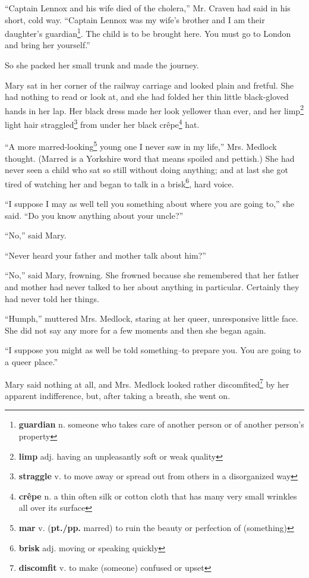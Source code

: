 ``Captain Lennox and his wife died of the cholera,'' Mr. Craven had said in his short, cold way. ``Captain Lennox was my wife's brother and I am their daughter's guardian\footnote{\textbf{guardian} n. someone who takes care of another person or of another person's property}. The child is to be brought here. You must go to London and bring her yourself.''

So she packed her small trunk and made the journey.

Mary sat in her corner of the railway carriage and looked plain and fretful. She had nothing to read or look at, and she had folded her thin little black-gloved hands in her lap. Her black dress made her look yellower than ever, and her limp\footnote{\textbf{limp} adj. having an unpleasantly soft or weak quality} light hair straggled\footnote{\textbf{straggle} v. to move away or spread out from others in a disorganized way} from under her black cr\^{e}pe\footnote{\textbf{cr\^{e}pe} n. a thin often silk or cotton cloth that has many very small wrinkles all over its surface} hat.

``A more marred-looking\footnote{\textbf{mar} v. (\textbf{pt./pp.} marred) to ruin the beauty or perfection of (something)} young one I never saw in my life,'' Mrs. Medlock thought. (Marred is a Yorkshire word that means spoiled and pettish.) She had never seen a child who sat so still without doing anything; and at last she got tired of watching her and began to talk in a brisk\footnote{\textbf{brisk} adj. moving or speaking quickly }, hard voice.

``I suppose I may as well tell you something about where you are going to,'' she said. ``Do you know anything about your uncle?''

``No,'' said Mary.

``Never heard your father and mother talk about him?''

``No,'' said Mary, frowning. She frowned because she remembered that her father and mother had never talked to her about anything in particular. Certainly they had never told her things.

``Humph,'' muttered Mrs. Medlock, staring at her queer, unresponsive little face. She did not say any more for a few moments and then she began again.

``I suppose you might as well be told something--to prepare you. You are going to a queer place.''

Mary said nothing at all, and Mrs. Medlock looked rather discomfited\footnote{\textbf{discomfit} v. to make (someone) confused or upset} by her apparent indifference, but, after taking a breath, she went on.

